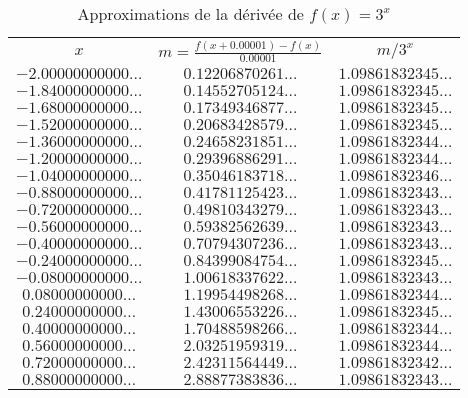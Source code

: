 \begin{table}
\caption{Approximations de la dérivée de $f(x) = 3^x$}
\label{TAB_3_EXP}
\begin{center}
\begin{tabular}{|c|c|c|}
\cline{1-3}
      $x$                               & $m = \frac{f(x+0.00001)-f(x)}{0.00001}$ &     $m/3^x$                             \\ 
\cline{1-3}
$-2.00000000000\ldots$ & $0.12206870261\ldots$ & $1.09861832345\ldots$ \\ 
$-1.84000000000\ldots$ & $0.14552705124\ldots$ & $1.09861832345\ldots$ \\ 
$-1.68000000000\ldots$ & $0.17349346877\ldots$ & $1.09861832345\ldots$ \\ 
$-1.52000000000\ldots$ & $0.20683428579\ldots$ & $1.09861832345\ldots$ \\ 
$-1.36000000000\ldots$ & $0.24658231851\ldots$ & $1.09861832344\ldots$ \\ 
$-1.20000000000\ldots$ & $0.29396886291\ldots$ & $1.09861832344\ldots$ \\ 
$-1.04000000000\ldots$ & $0.35046183718\ldots$ & $1.09861832346\ldots$ \\ 
$-0.88000000000\ldots$ & $0.41781125423\ldots$ & $1.09861832343\ldots$ \\ 
$-0.72000000000\ldots$ & $0.49810343279\ldots$ & $1.09861832343\ldots$ \\ 
$-0.56000000000\ldots$ & $0.59382562639\ldots$ & $1.09861832343\ldots$ \\ 
$-0.40000000000\ldots$ & $0.70794307236\ldots$ & $1.09861832343\ldots$ \\ 
$-0.24000000000\ldots$ & $0.84399084754\ldots$ & $1.09861832345\ldots$ \\ 
$-0.08000000000\ldots$ & $1.00618337622\ldots$ & $1.09861832343\ldots$ \\ 
$0.08000000000\ldots$ & $1.19954498268\ldots$ & $1.09861832344\ldots$ \\ 
$0.24000000000\ldots$ & $1.43006553226\ldots$ & $1.09861832345\ldots$ \\ 
$0.40000000000\ldots$ & $1.70488598266\ldots$ & $1.09861832344\ldots$ \\ 
$0.56000000000\ldots$ & $2.03251959319\ldots$ & $1.09861832344\ldots$ \\ 
$0.72000000000\ldots$ & $2.42311564449\ldots$ & $1.09861832342\ldots$ \\ 
$0.88000000000\ldots$ & $2.88877383836\ldots$ & $1.09861832343\ldots$ \\ 

\end{tabular}
\end{center}
\end{table}

